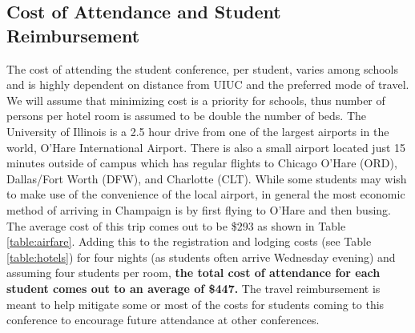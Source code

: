 

\subsection{Cost of Attendance and Student Reimbursement}
The cost of attending the student conference, per student, varies among schools 
and is highly dependent on distance from UIUC and the preferred mode of travel. 
We will assume that minimizing cost is a priority for schools, thus number of 
persons per hotel room is assumed to be double the number of beds. The 
University of Illinois is a 2.5 hour drive from one of the largest airports in 
the world, O'Hare International Airport. There is also a small airport located 
just 15 minutes outside of campus which has regular flights to Chicago O'Hare 
(ORD), Dallas/Fort Worth (DFW), and Charlotte (CLT). While some students may 
wish to make use of the convenience of the local airport, in general the most 
economic method of arriving in Champaign is by first flying to O’Hare and then 
busing. The average cost of this trip comes out to be \$293 as shown in Table  
\ref{table:airfare}. Adding this to the registration and lodging costs (see 
Table \ref{table:hotels}) for four nights (as students often arrive Wednesday 
evening) and assuming four students per room, \textbf{the total cost of attendance for 
each student comes out to an average of \$447.} The travel reimbursement is 
meant to help mitigate some or most of the costs for students coming to this 
conference to encourage future attendance at other conferences.


